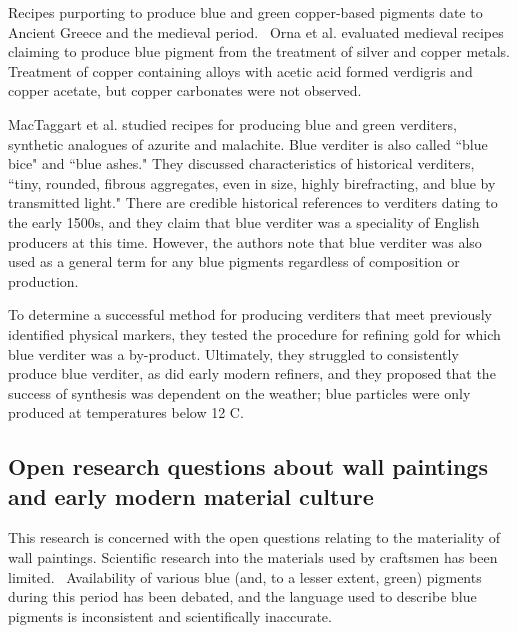 Recipes purporting to produce blue and green copper-based pigments date to Ancient Greece and the medieval period.~\autocite{mappae_clavicula, Orna_literature, Orna_silver, Barnett} Orna et al. evaluated medieval recipes claiming to produce blue pigment from the treatment of silver and copper metals. Treatment of copper containing alloys with acetic acid formed verdigris and copper acetate, but copper carbonates were not observed.~\autocite{Orna_literature,Orna_silver}

MacTaggart et al. studied recipes for producing blue and green verditers, synthetic analogues of azurite and malachite. Blue verditer is also called ``blue bice" and ``blue ashes." They discussed characteristics of historical verditers, ``tiny, rounded, fibrous aggregates, even in size, highly birefracting, and blue by transmitted light." There are credible historical references to verditers dating to the early 1500s, and they claim that blue verditer was a speciality of English producers at this time. However, the authors note that blue verditer was also used as a general term for any blue pigments regardless of composition or production. 

To determine a successful method for producing verditers that meet previously identified physical markers, they tested the procedure for refining gold for which blue verditer was a by-product. Ultimately, they struggled to consistently produce blue verditer, as did early modern refiners, and they proposed that the success of synthesis was dependent on the weather; blue particles were only produced at temperatures below 12 \textdegree C.~\autocite{MacTaggart}

\subsection[Open research questions about wall paintings]{Open research questions about wall paintings and early modern material culture}
\label{subsection1.1.4}

This research is concerned with the open questions relating to the materiality of wall paintings. Scientific research into the materials used by craftsmen has been limited.~\autocite{Baird_thesis, Davies_book} Availability of various blue (and, to a lesser extent, green) pigments during this period has been debated, and the language used to describe blue pigments is inconsistent and scientifically inaccurate.~\autocite{Harley} 

